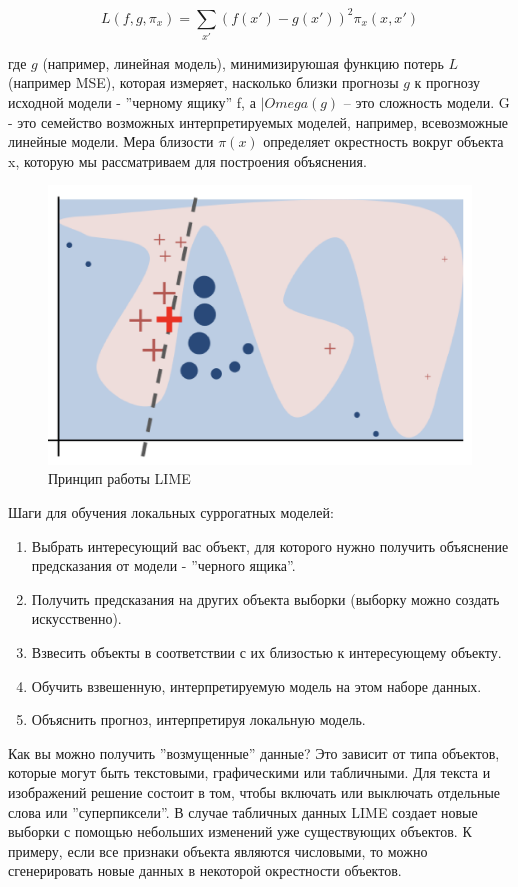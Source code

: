 \documentclass[12pt]{article}
\begin{document}
$$L(f,g,\pi_x) = \sum\limits_{x'} (f(x') - g(x'))^2\pi_x(x,x')$$

\noindent
где $g$ (например, линейная модель), минимизируюшая функцию потерь $L$ (например MSE), которая 
измеряет, насколько близки прогнозы $g$ к прогнозу исходной модели - ''черному ящику'' f, 
а $|Omega(g)$  -- это сложность модели. G - это семейство возможных
интерпретируемых моделей, например, всевозможные линейные модели. Мера близости  
$\pi(x)$ определяет окрестность вокруг объекта x, которую мы рассматриваем для построения объяснения. 

\begin{figure}[htb]
    \centering
    \includegraphics[width=0.8\linewidth]{lime_from_article.png}
    \caption{Принцип работы LIME}
    \label{lime_from_article}
\end{figure}


Шаги для обучения локальных суррогатных моделей:

\begin{enumerate}
    \item Выбрать интересующий вас объект, 
    для которого нужно получить объяснение предсказания от модели - ''черного ящика''.
    \item Получить предсказания на других объекта выборки (выборку можно создать искусственно).
    \item Взвесить объекты в соответствии с их близостью к интересующему объекту.
    \item Обучить взвешенную, интерпретируемую модель на этом наборе данных.
    \item Объяснить прогноз, интерпретируя локальную модель.
\end{enumerate}

Как вы можно получить ''возмущенные'' данные? Это зависит от типа объектов, которые
могут быть текстовыми, графическими или табличными. 
Для текста и изображений решение состоит в том, чтобы включать или 
выключать отдельные слова или ''суперпиксели''. В случае табличных данных 
LIME создает новые выборки с помощью небольших изменений уже существующих объектов. К примеру,
если все признаки объекта являются числовыми, то можно сгенерировать новые данных в некоторой окрестности объектов.
\end{document}
